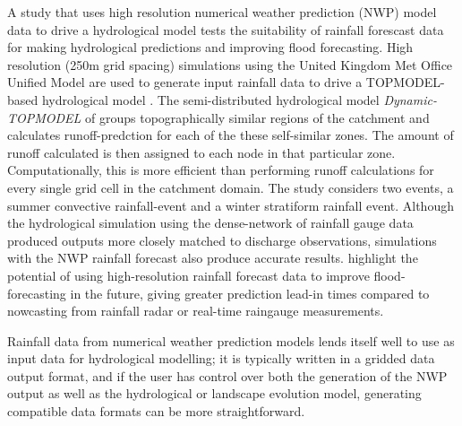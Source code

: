 A study that uses high resolution numerical weather prediction (NWP) model data to drive a hydrological model \citep{younger2008usability} tests the suitability of rainfall forescast data for making hydrological predictions and improving flood forecasting. High resolution (250m grid spacing) simulations using the United Kingdom Met Office Unified Model are used to generate input rainfall data to drive a TOPMODEL-based hydrological model \citep{beven2001dynamic}. The semi-distributed hydrological model \textit{Dynamic-TOPMODEL} of \citet{beven2001dynamic} groups topographically similar regions of the catchment and calculates runoff-predction for each of the these self-similar zones. The amount of runoff calculated is then assigned to each node in that particular zone. Computationally, this is more efficient than performing runoff calculations for every single grid cell in the catchment domain.
The \citet{younger2008usability} study considers two events, a summer convective rainfall-event and a winter stratiform rainfall event. Although the hydrological simulation using the dense-network of rainfall gauge data produced outputs more closely matched to discharge observations, simulations with the NWP rainfall forecast also produce accurate results. \citet{younger2008usability} highlight the potential of using high-resolution rainfall forecast data to improve flood-forecasting in the future, giving greater prediction lead-in times compared to nowcasting from rainfall radar or real-time raingauge measurements. 

Rainfall data from numerical weather prediction models lends itself well to use as input data for hydrological modelling; it is typically written in a gridded data output format, and if the user has control over both the generation of the NWP output as well as the hydrological or landscape evolution model, generating compatible data formats can be more straightforward.

